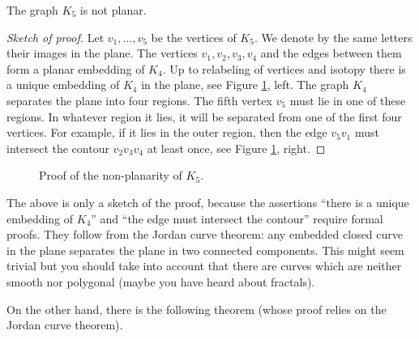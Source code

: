 \begin{page}
\setcounter{section}{3}
\setcounter{subsection}{1}
\setcounter{dfn}{3}
\label{portion:283}

\begin{thm}
The graph $K_5$ is not planar.
\end{thm}

\end{page}

\begin{page}
\setcounter{section}{3}
\setcounter{subsection}{1}
\setcounter{dfn}{3}
\label{portion:284}

\begin{proof}[Sketch of proof]
Let $v_1, \ldots, v_5$ be the vertices of $K_5$.
We denote by the same letters their images in the plane.
The vertices $v_1, v_2, v_3, v_4$ and the edges between them form a planar embedding of $K_4$.
Up to relabeling of vertices and isotopy there is a unique embedding of $K_4$ in the plane, see Figure \ref{fig:K4Embedding}, left.
The graph $K_4$ separates the plane into four regions.
The fifth vertex $v_5$ must lie in one of these regions.
In whatever region it lies, it will be separated from one of the first four vertices.
For example, if it lies in the outer region,
then the edge $v_5v_1$ must intersect the contour $v_2v_3v_4$ at least once, see Figure \ref{fig:K4Embedding}, right.
\end{proof}

\begin{figure}[ht]
\begin{center}

\end{center}
\caption{Proof of the non-planarity of $K_5$.}
\label{fig:K4Embedding}
\end{figure}

The above is only a sketch of the proof, because the assertions
``there is a unique embedding of $K_4$'' and ``the edge must intersect the contour'' require formal proofs.
They follow from the Jordan curve theorem: any embedded closed curve in the plane separates the plane in two connected components.
This might seem trivial but you should take into account that there are curves which are neither smooth nor polygonal
(maybe you have heard about fractals).

On the other hand, there is the following theorem (whose proof relies on the Jordan curve theorem).

\end{page}

